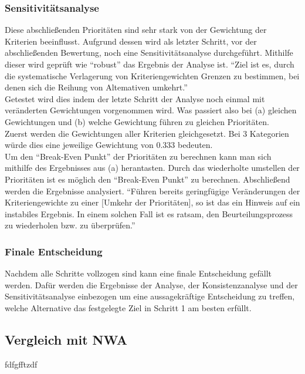 \subsubsection{Sensitivitätsanalyse}
Diese abschließenden Prioritäten sind sehr stark von der Gewichtung der Kriterien beeinflusst.\autocite[Vgl.][S.19]{Mu.2018} Aufgrund dessen wird als letzter Schritt, vor der abschließenden Bewertung, noch eine Sensitivitätsanalyse durchgeführt. Mithilfe dieser wird geprüft wie \enquote{robust} das Ergebnis der Analyse ist.\autocite[Vgl.][S.20]{Mu.2018} \enquote{Ziel ist es, durch die systematische Verlagerung von Kriteriengewichten Grenzen zu bestimmen, bei denen sich die Reihung von Altemativen umkehrt.}\autocite[S.111]{Fink.2006}\\ 
Getestet wird dies indem der letzte Schritt der Analyse noch einmal mit veränderten Gewichtungen vorgenommen wird. Was passiert also bei (a) gleichen Gewichtungen und (b) welche Gewichtung führen zu gleichen Prioritäten.\autocite[Vgl.][S.20]{Mu.2018}\\
Zuerst werden die Gewichtungen aller Kriterien gleichgesetzt. Bei 3 Kategorien würde dies eine jeweilige Gewichtung von $0.333$ bedeuten.\\
Um den \enquote{Break-Even Punkt}\autocite[S.21]{Mu.2018} der Prioritäten zu berechnen kann man sich mithilfe des Ergebnisses aus (a) herantasten. Durch das wiederholte umstellen der Prioritäten ist es möglich den \enquote{Break-Even Punkt} zu berechnen. Abschließend werden die Ergebnisse analysiert. \enquote{Führen bereits geringfügige Veränderungen der Kriteriengewichte zu einer [Umkehr der Prioritäten], so ist das ein Hinweis auf ein instabiles Ergebnis. In einem solchen Fall ist es ratsam, den Beurteilungsprozess zu wiederholen bzw. zu überprüfen.}\autocite[S.111]{Fink.2006}
\subsubsection{Finale Entscheidung}
Nachdem alle Schritte vollzogen sind kann eine finale Entscheidung gefällt werden. Dafür werden die Ergebnisse der Analyse, der Konsistenzanalyse und der Sensitivitätsanalyse einbezogen um eine aussagekräftige Entscheidung zu treffen, welche Alternative das festgelegte Ziel in Schritt 1 am besten erfüllt.
\subsection{Vergleich mit NWA}
fdfgfftzdf
